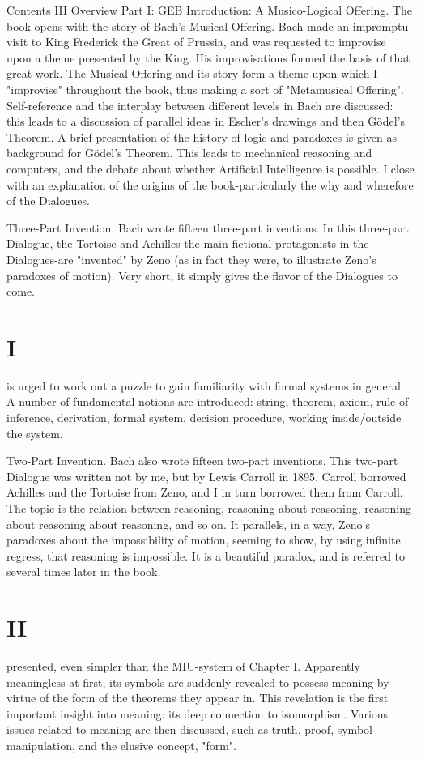 Contents                                                         III Overview Part I: GEB Introduction: A Musico-Logical Offering. The book opens with the story of Bach's Musical Offering. Bach made an impromptu visit to King Frederick the Great of Prussia, and was requested to improvise upon a theme presented by the King. His improvisations formed the basis of that great work. The Musical Offering and its story form a theme upon which I "improvise" throughout the book, thus making a sort of "Metamusical Offering". Self-reference and the interplay between different levels in Bach are discussed: this leads to a discussion of parallel ideas in Escher's drawings and then Gödel’s Theorem. A brief presentation of the history of logic and paradoxes is given as background for Gödel’s Theorem. This leads to mechanical reasoning and computers, and the debate about whether Artificial Intelligence is possible. I close with an explanation of the origins of the book-particularly the why and wherefore of the Dialogues. 

Three-Part Invention. Bach wrote fifteen three-part inventions. In this three-part Dialogue, the Tortoise and Achilles-the main fictional protagonists in the Dialogues-are "invented" by Zeno (as in fact they were, to illustrate Zeno's paradoxes of motion). Very short, it simply gives the flavor of the Dialogues to come. 


\chapter {I}
is urged to work out a puzzle to gain familiarity with formal systems in general. A number of fundamental notions are introduced: string, theorem, axiom, rule of inference, derivation, formal system, decision procedure, working inside/outside the system. 

Two-Part Invention. Bach also wrote fifteen two-part inventions. This two-part Dialogue was written not by me, but by Lewis Carroll in 1895. Carroll borrowed Achilles and the Tortoise from Zeno, and I in turn borrowed them from Carroll. The topic is the relation between reasoning, reasoning about reasoning, reasoning about reasoning about reasoning, and so on. It parallels, in a way, Zeno's paradoxes about the impossibility of motion, seeming to show, by using infinite regress, that reasoning is impossible. It is a beautiful paradox, and is referred to several times later in the book. 


\chapter {II}
presented, even simpler than the MIU-system of Chapter I. Apparently meaningless at first, its symbols are suddenly revealed to possess meaning by virtue of the form of the theorems they appear in. This revelation is the first important insight into meaning: its deep connection to isomorphism. Various issues related to meaning are then discussed, such as truth, proof, symbol manipulation, and the elusive concept, "form". 

